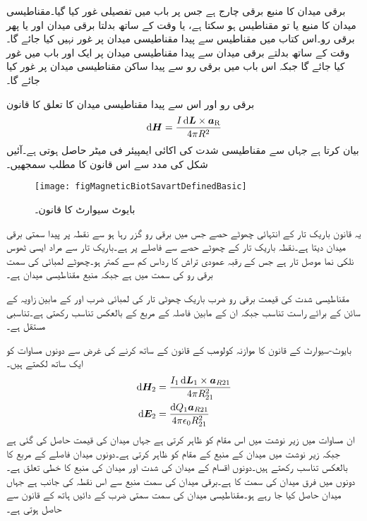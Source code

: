 برقی میدان کا منبع برقی چارج ہے جس پر باب  میں تفصیلی غور کیا گیا۔مقناطیسی میدان کا منبع یا تو مقناطیس ہو سکتا ہے، یا وقت کے ساتھ بدلتا برقی میدان اور یا پھر برقی رو۔اس کتاب میں مقناطیس سے پیدا مقناطیسی میدان پر غور نہیں کیا جائے گا۔وقت کے ساتھ بدلتے برقی میدان سے پیدا مقناطیسی میدان پر ایک اور باب میں غور کیا جائے گا جبکہ اس باب میں برقی رو سے پیدا ساکن مقناطیسی میدان پر غور کیا جائے گا۔

برقی رو اور اس سے پیدا مقناطیسی میدان کا تعلق  کا قانون
\begin{align}\label{مساوات_بایوٹ_سیوارٹ_تفرق_شکل}
\dif \kvec{H}=\frac{I \dif \kvec{L} \times \aR}{4 \pi R^2}
\end{align}
 بیان کرتا ہے جہاں سے مقناطیسی شدت  کی اکائی ایمپیئر فی میٹر  حاصل ہوتی ہے۔آئیں شکل  کی مدد سے  اس قانون کا مطلب سمجھیں۔

\begin{figure}
\centering
\texttt{[image: figMagneticBiotSavartDefinedBasic]}
\caption{بایوٹ سیوارٹ کا قانون۔}
\label{شکل_مقناطیسی_بایوٹ_سیوارٹ_قانون}
\end{figure}
یہ قانون باریک تار کے انتہائی چھوٹے حصے  جس میں  برقی رو گزر رہا ہو سے  نقطہ  پر پیدا سمتی برقی میدان  دیتا ہے۔نقطہ  باریک تار کے چھوٹے حصے سے  فاصلے پر ہے۔باریک تار سے مراد ایسی ٹھوس نلکی نما موصل تار ہے جس کے رقبہ عمودی تراش کا رداس کم سے کمتر ہو۔چھوٹے لمبائی  کی سمت برقی رو کی سمت میں ہے جبکہ  منبع مقناطیسی میدان ہے۔

مقناطیسی شدت کی قیمت برقی رو ضرب باریک چھوٹی تار کی لمبائی ضرب  اور  کے مابین زاویہ کے سائن کے برائے راست تناسب جبکہ ان کے مابین فاصلہ  کے مربع کے بالعکس تناسب رکھتی ہے۔تناسبی مستقل  ہے۔

بایوٹ-سیوارٹ کے  قانون کا موازنہ کولومب کے قانون کے ساتھ کرنے کی غرض سے دونوں مساوات کو ایک ساتھ لکھتے ہیں۔
\begin{gather}
\begin{aligned}\label{مساوات_بایوٹ_سیوارٹ_تفرق_شکل_ب}
\dif \kvec{H}_2&=\frac{I_1 \dif \kvec{L}_1 \times \kvec{a}_{R21}}{4 \pi R_{21}^2}\\
\dif \kvec{E}_2&=\frac{\dif Q_1 \kvec{a}_{R21}}{4\pi \epsilon_0 R_{21}^2}
\end{aligned}
\end{gather}
ان مساوات میں زیر نوشت میں  اس مقام کو ظاہر کرتی ہے جہاں میدان کی قیمت حاصل کی گئی ہے جبکہ زیر نوشت میں  میدان کے منبع کے مقام کو ظاہر کرتی ہے۔دونوں میدان فاصلے کے مربع کا بالعکس تناسب رکھتے ہیں۔دونوں اقسام کے میدان کی شدت اور میدان کی منبع کا خطی تعلق ہے۔دونوں میں فرق میدان کی سمت کا ہے۔برقی میدان کی سمت منبع سے اس نقطہ کی جانب ہے جہاں میدان حاصل کیا جا رہے ہو۔مقناطیسی میدان کی سمت سمتی ضرب کے دائیں ہاتھ کے قانون سے حاصل ہوتی ہے۔

